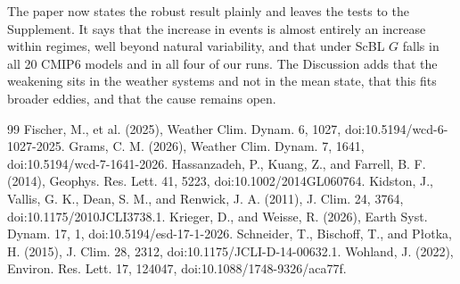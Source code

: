 \documentclass[10pt,a4paper]{article}
\begin{document}
The paper now states the robust result plainly and leaves the tests to the Supplement.
It says that the increase in events is almost entirely an increase within regimes, well beyond natural variability,
and that under ScBL $G$ falls in all 20 CMIP6 models and in all four of our runs.
The Discussion adds that the weakening sits in the weather systems and not in the mean state, that this fits broader
eddies, and that the cause remains open.

\begin{thebibliography}{99}\small
{} Fischer, M., et al. (2025), Weather Clim. Dynam. 6, 1027, doi:10.5194/wcd-6-1027-2025.
 Grams, C. M. (2026), Weather Clim. Dynam. 7, 1641, doi:10.5194/wcd-7-1641-2026.
 Hassanzadeh, P., Kuang, Z., and Farrell, B. F. (2014), Geophys. Res. Lett. 41, 5223, doi:10.1002/2014GL060764.
 Kidston, J., Vallis, G. K., Dean, S. M., and Renwick, J. A. (2011), J. Clim. 24, 3764, doi:10.1175/2010JCLI3738.1.
 Krieger, D., and Weisse, R. (2026), Earth Syst. Dynam. 17, 1, doi:10.5194/esd-17-1-2026.
 Schneider, T., Bischoff, T., and P{\l}otka, H. (2015), J. Clim. 28, 2312, doi:10.1175/JCLI-D-14-00632.1.
 Wohland, J. (2022), Environ. Res. Lett. 17, 124047, doi:10.1088/1748-9326/aca77f.
\end{thebibliography}
\end{document}
